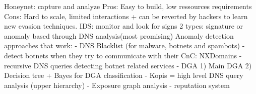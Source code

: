 
Honeynet: capture and analyze Pros: Easy to build, low ressources requirements Cons: Hard to
scale, limited interactions + can be reverted by hackers to learn new evasion techniques.
IDS: monitor and look for signs 2 types: signature or anomaly based through DNS analysis(most
promising) %
Anomaly detection approaches that work: 
- DNS Blacklist (for malware, botnets and spambots) 
- detect botnets when they try to communicate with their CnC:
NXDomains 
- recursive DNS queries detecting botnet related services %
- DGA 
1) Main DGA %
2) Decision tree + Bayes for DGA classification 
- Kopis = high level DNS query analysis (upper hierarchy)
- Exposure 
graph analysis 
- reputation system 






